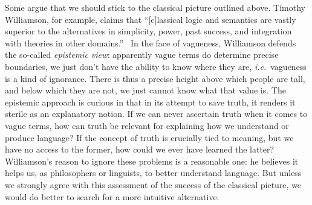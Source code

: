 \documentclass[a4paper]{article}
\begin{document}
Some argue that we should stick to the classical picture outlined above.
Timothy Williamson, for example, claims that ``[c]lassical logic and semantics are vastly superior to the alternatives in simplicity, power, past success, and integration with theories in other domains.''~\parencite*[162]{williamson_vagueness_1992}
In the face of vagueness, Williamson defends the so-called \emph{epistemic view}: apparently vague terms do determine precise boundaries, we just don't have the ability to know where they are, \emph{i.e.}~vagueness is a kind of ignorance.
There is thus a precise height above which people are tall, and below which they are not, we just cannot know what that value is.
The epistemic approach is curious in that in its attempt to save truth, it renders it sterile as an explanatory notion.
If we can never ascertain truth when it comes to vague terms, how can truth be relevant for explaining how we understand or produce language?
If the concept of truth is crucially tied to meaning, but we have no access to the former, how could we ever have learned the latter?
Williamson's reason to ignore these problems is a reasonable one: he believes it helps us, as philosophers or linguists, to better understand language.
But unless we strongly agree with this assessment of the success of the classical picture, we would do better to search for a more intuitive alternative.
\end{document}

